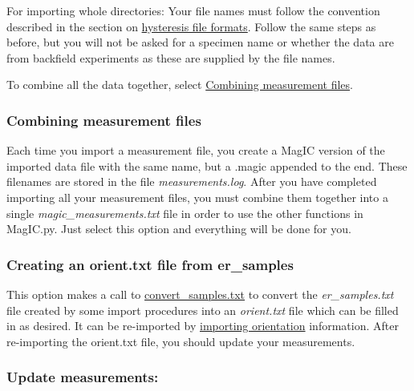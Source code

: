 \documentclass[11pt]{book}
\begin{document}
{For importing whole directories:   Your file names must follow the convention described in the section on \href{#Hysteresis_file_formats}{hysteresis file formats}.   Follow the same steps as before, but you will not be asked for a specimen name or whether the data are from backfield experiments as these are supplied by the file names.  

To combine all the data together, select \href{#Combining_measurement_files}{Combining measurement files}.  




\subsubsection{Combining measurement files}
Each time you import a measurement file, you create a MagIC version of the imported data file with the same name, but a .magic appended to the end.  These filenames are stored in the file {\it measurements.log}.  After you have completed importing all your measurement files, you must combine them together into a single {\it magic\_measurements.txt} file in order to use the other functions in MagIC.py.  Just select this option and everything will be done for you. 



\subsubsection{Creating an orient.txt file from er\_samples}

This option makes a call to \href{#convert_samples.txt}{convert\_samples.txt} to convert the {\it er\_samples.txt} file created by some import procedures into an {\it orient.txt} file which can be filled in as desired.  It can be re-imported by \href{#ImportOrient}{importing orientation} information.   After re-importing the orient.txt file, you should update your measurements.  

\subsubsection{Update measurements:}

}
\end{document}
